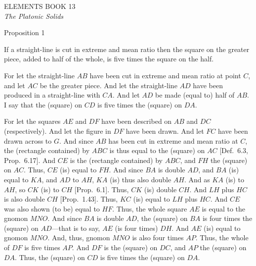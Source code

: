 \pagestyle{plain}
\begin{center}
{\Huge ELEMENTS BOOK 13}\\
\spa\spa\spa
{\huge\it The Platonic Solids}
\end{center}
\newpage

\pagestyle{fancy}
\cfoot{\gr{\thepage}}

\begin{center}
{\large Proposition 1}
\end{center}

If a straight-line is cut in extreme and mean ratio then the square on the
greater piece, added to half of the whole, is  five times the square
on the half.

\epsfysize=2.5in
\centerline{}

For let the straight-line $AB$ have been cut in extreme and mean ratio at
point $C$, and let $AC$ be the greater piece. And let the straight-line
$AD$ have been produced in a straight-line with $CA$. And let
$AD$ be made (equal to) half of $AB$. I say that the (square) on
$CD$ is five times the (square) on $DA$. 

For let the squares $AE$ and $DF$ have been described on $AB$ and
$DC$ (respectively). And let the figure in $DF$ have been drawn.  
And let $FC$ have been drawn across to $G$. And since $AB$ has been
cut in extreme and mean ratio at $C$, the (rectangle
contained) by $ABC$ is thus equal to the (square) on $AC$ [Def.~6.3, Prop.~6.17].
And  $CE$ is the (rectangle contained) by $ABC$, and $FH$ the
(square) on $AC$. Thus, $CE$ (is) equal to $FH$. 
And since $BA$ is double $AD$, and $BA$ (is) equal to $KA$,
and $AD$ to $AH$, $KA$ (is) thus also double $AH$. 
And as $KA$ (is) to $AH$, so $CK$ (is) to $CH$ [Prop.~6.1].
Thus, $CK$ (is) double $CH$. And $LH$ plus $HC$ is also double $CH$
[Prop.~1.43].  Thus, $KC$ (is) equal to $LH$ plus $HC$. And
$CE$ was also shown (to be) equal to $HF$. Thus, the whole square
$AE$ is equal to the gnomon $MNO$. And since $BA$ is double
$AD$, the (square) on $BA$ is four times the (square) on $AD$---that
is to say, $AE$ (is four times) $DH$. And $AE$ (is) equal to
gnomon $MNO$. And, thus, gnomon $MNO$ is also four times $AP$. 
Thus, the whole of $DF$ is five times $AP$. And $DF$ is the (square)
on $DC$, and $AP$ the (square) on $DA$. Thus, the
(square) on $CD$ is five times the (square) on $DA$. 

